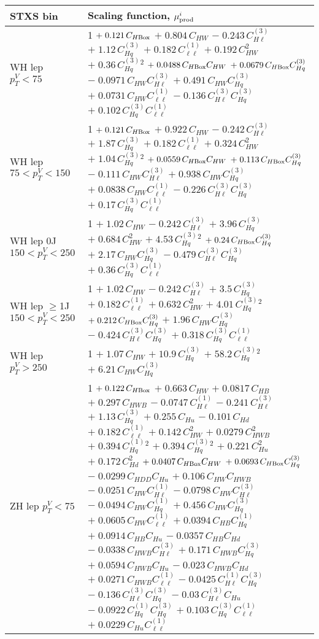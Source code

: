 \begin{tabular}{l|p{}}
    STXS bin & Scaling function, $\mu^i_{\rm{prod}}$ \\ \hline
    WH lep $p_{T}^{V} < 75$ & 1 $+\;0.121\,C_{H\rm{Box}}$ $+\;0.804\,C_{HW}$ $-\;0.243\,C^{(3)}_{H\ell}$ $+\;1.12\,C^{(3)}_{Hq}$ $+\;0.182\,C^{(1)}_{\ell\ell}$ $+\;0.192\,C_{HW}^{2}$ $+\;0.36\,C^{(3)}_{Hq}^{2}$ $+\;0.0488\,C_{H\rm{Box}}C_{HW}$ $+\;0.0679\,C_{H\rm{Box}}C^{(3)}_{Hq}$ $-\;0.0971\,C_{HW}C^{(3)}_{H\ell}$ $+\;0.491\,C_{HW}C^{(3)}_{Hq}$ $+\;0.0731\,C_{HW}C^{(1)}_{\ell\ell}$ $-\;0.136\,C^{(3)}_{H\ell}C^{(3)}_{Hq}$ $+\;0.102\,C^{(3)}_{Hq}C^{(1)}_{\ell\ell}$ \\
    WH lep $75 < p_{T}^{V} < 150$ & 1 $+\;0.121\,C_{H\rm{Box}}$ $+\;0.922\,C_{HW}$ $-\;0.242\,C^{(3)}_{H\ell}$ $+\;1.87\,C^{(3)}_{Hq}$ $+\;0.182\,C^{(1)}_{\ell\ell}$ $+\;0.324\,C_{HW}^{2}$ $+\;1.04\,C^{(3)}_{Hq}^{2}$ $+\;0.0559\,C_{H\rm{Box}}C_{HW}$ $+\;0.113\,C_{H\rm{Box}}C^{(3)}_{Hq}$ $-\;0.111\,C_{HW}C^{(3)}_{H\ell}$ $+\;0.938\,C_{HW}C^{(3)}_{Hq}$ $+\;0.0838\,C_{HW}C^{(1)}_{\ell\ell}$ $-\;0.226\,C^{(3)}_{H\ell}C^{(3)}_{Hq}$ $+\;0.17\,C^{(3)}_{Hq}C^{(1)}_{\ell\ell}$ \\
    WH lep 0J $150 < p_{T}^{V} < 250$ & 1 $+\;1.02\,C_{HW}$ $-\;0.242\,C^{(3)}_{H\ell}$ $+\;3.96\,C^{(3)}_{Hq}$ $+\;0.684\,C_{HW}^{2}$ $+\;4.53\,C^{(3)}_{Hq}^{2}$ $+\;0.24\,C_{H\rm{Box}}C^{(3)}_{Hq}$ $+\;2.17\,C_{HW}C^{(3)}_{Hq}$ $-\;0.479\,C^{(3)}_{H\ell}C^{(3)}_{Hq}$ $+\;0.36\,C^{(3)}_{Hq}C^{(1)}_{\ell\ell}$ \\
    WH lep $\geq$1J $150 < p_{T}^{V} < 250$ & 1 $+\;1.02\,C_{HW}$ $-\;0.242\,C^{(3)}_{H\ell}$ $+\;3.5\,C^{(3)}_{Hq}$ $+\;0.182\,C^{(1)}_{\ell\ell}$ $+\;0.632\,C_{HW}^{2}$ $+\;4.01\,C^{(3)}_{Hq}^{2}$ $+\;0.212\,C_{H\rm{Box}}C^{(3)}_{Hq}$ $+\;1.96\,C_{HW}C^{(3)}_{Hq}$ $-\;0.424\,C^{(3)}_{H\ell}C^{(3)}_{Hq}$ $+\;0.318\,C^{(3)}_{Hq}C^{(1)}_{\ell\ell}$ \\
    WH lep $p_{T}^{V} > 250$ & 1 $+\;1.07\,C_{HW}$ $+\;10.9\,C^{(3)}_{Hq}$ $+\;58.2\,C^{(3)}_{Hq}^{2}$ $+\;6.21\,C_{HW}C^{(3)}_{Hq}$ \\
    \hline
    ZH lep $p_{T}^{V} < 75$ & 1 $+\;0.122\,C_{H\rm{Box}}$ $+\;0.663\,C_{HW}$ $+\;0.0817\,C_{HB}$ $+\;0.297\,C_{HWB}$ $-\;0.0747\,C^{(1)}_{H\ell}$ $-\;0.241\,C^{(3)}_{H\ell}$ $+\;1.13\,C^{(3)}_{Hq}$ $+\;0.255\,C_{Hu}$ $-\;0.101\,C_{Hd}$ $+\;0.182\,C^{(1)}_{\ell\ell}$ $+\;0.142\,C_{HW}^{2}$ $+\;0.0279\,C_{HWB}^{2}$ $+\;0.394\,C^{(1)}_{Hq}^{2}$ $+\;0.394\,C^{(3)}_{Hq}^{2}$ $+\;0.221\,C_{Hu}^{2}$ $+\;0.172\,C_{Hd}^{2}$ $+\;0.0407\,C_{H\rm{Box}}C_{HW}$ $+\;0.0693\,C_{H\rm{Box}}C^{(3)}_{Hq}$ $-\;0.0299\,C_{HDD}C_{Hu}$ $+\;0.106\,C_{HW}C_{HWB}$ $-\;0.0251\,C_{HW}C^{(1)}_{H\ell}$ $-\;0.0798\,C_{HW}C^{(3)}_{H\ell}$ $-\;0.0494\,C_{HW}C^{(1)}_{Hq}$ $+\;0.456\,C_{HW}C^{(3)}_{Hq}$ $+\;0.0605\,C_{HW}C^{(1)}_{\ell\ell}$ $+\;0.0394\,C_{HB}C^{(1)}_{Hq}$ $+\;0.0914\,C_{HB}C_{Hu}$ $-\;0.0357\,C_{HB}C_{Hd}$ $-\;0.0338\,C_{HWB}C^{(3)}_{H\ell}$ $+\;0.171\,C_{HWB}C^{(3)}_{Hq}$ $+\;0.0594\,C_{HWB}C_{Hu}$ $-\;0.023\,C_{HWB}C_{Hd}$ $+\;0.0271\,C_{HWB}C^{(1)}_{\ell\ell}$ $-\;0.0425\,C^{(1)}_{H\ell}C^{(3)}_{Hq}$ $-\;0.136\,C^{(3)}_{H\ell}C^{(3)}_{Hq}$ $-\;0.03\,C^{(3)}_{H\ell}C_{Hu}$ $-\;0.0922\,C^{(1)}_{Hq}C^{(3)}_{Hq}$ $+\;0.103\,C^{(3)}_{Hq}C^{(1)}_{\ell\ell}$ $+\;0.0229\,C_{Hu}C^{(1)}_{\ell\ell}$ \\

\end{tabular}
